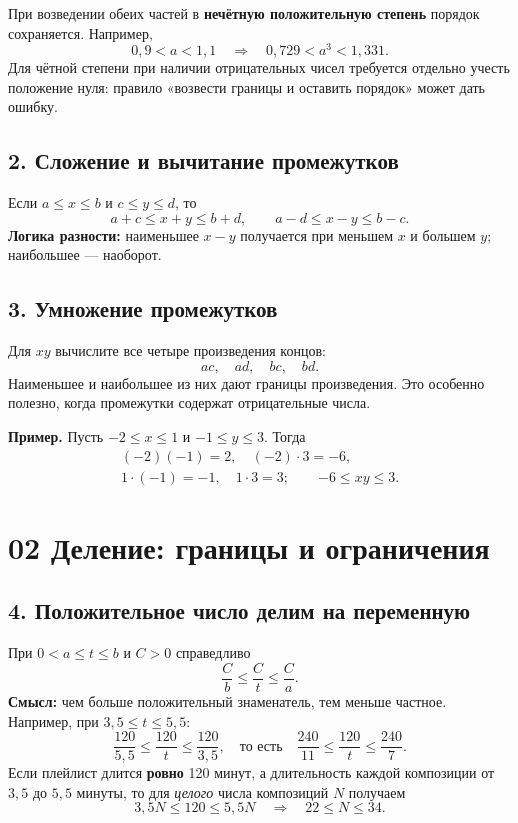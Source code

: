 \documentclass[a4paper,12pt]{article}
\newcommand{\key}[1]{\textbf{\textcolor{darkaccent}{#1}}}
\begin{document}
При возведении обеих частей в \key{нечётную положительную степень} порядок сохраняется. Например,
\[
0{,}9<a<1{,}1 \quad\Longrightarrow\quad
0{,}729<a^3<1{,}331.
\]
Для чётной степени при наличии отрицательных чисел требуется отдельно учесть положение нуля: правило «возвести границы и оставить порядок» может дать ошибку.

\subsection*{2. Сложение и вычитание промежутков}
Если $a\le x\le b$ и $c\le y\le d$, то
\[
\boxed{a+c\le x+y\le b+d},\qquad
\boxed{a-d\le x-y\le b-c}.
\]
\key{Логика разности:} наименьшее $x-y$ получается при меньшем $x$ и большем $y$; наибольшее --- наоборот.

\subsection*{3. Умножение промежутков}
Для $xy$ вычислите все четыре произведения концов:
\[
ac,\quad ad,\quad bc,\quad bd.
\]
Наименьшее и наибольшее из них дают границы произведения. Это особенно полезно, когда промежутки содержат отрицательные числа.

\key{Пример.} Пусть $-2\le x\le1$ и $-1\le y\le3$. Тогда
\[
\begin{gathered}
(-2)(-1)=2,\quad(-2)\cdot3=-6,\\
1\cdot(-1)=-1,\quad1\cdot3=3;
\qquad \boxed{-6\le xy\le3}.
\end{gathered}
\]
\clearpage

\section*{02 \quad Деление: границы и ограничения}
\subsection*{4. Положительное число делим на переменную}
При $0<a\le t\le b$ и $C>0$ справедливо
\[
\boxed{\frac{C}{b}\le\frac{C}{t}\le\frac{C}{a}}.
\]
\key{Смысл:} чем больше положительный знаменатель, тем меньше частное. Например, при $3{,}5\le t\le5{,}5$:
\[
\frac{120}{5{,}5}\le\frac{120}{t}\le\frac{120}{3{,}5},
\quad\text{то есть}\quad
\frac{240}{11}\le\frac{120}{t}\le\frac{240}{7}.
\]
Если плейлист длится \key{ровно} 120 минут, а длительность каждой композиции от $3{,}5$ до $5{,}5$ минуты, то для \emph{целого} числа композиций $N$ получаем
\[
3{,}5N\le120\le5{,}5N
\quad\Longrightarrow\quad \boxed{22\le N\le34}.
\]
\end{document}

